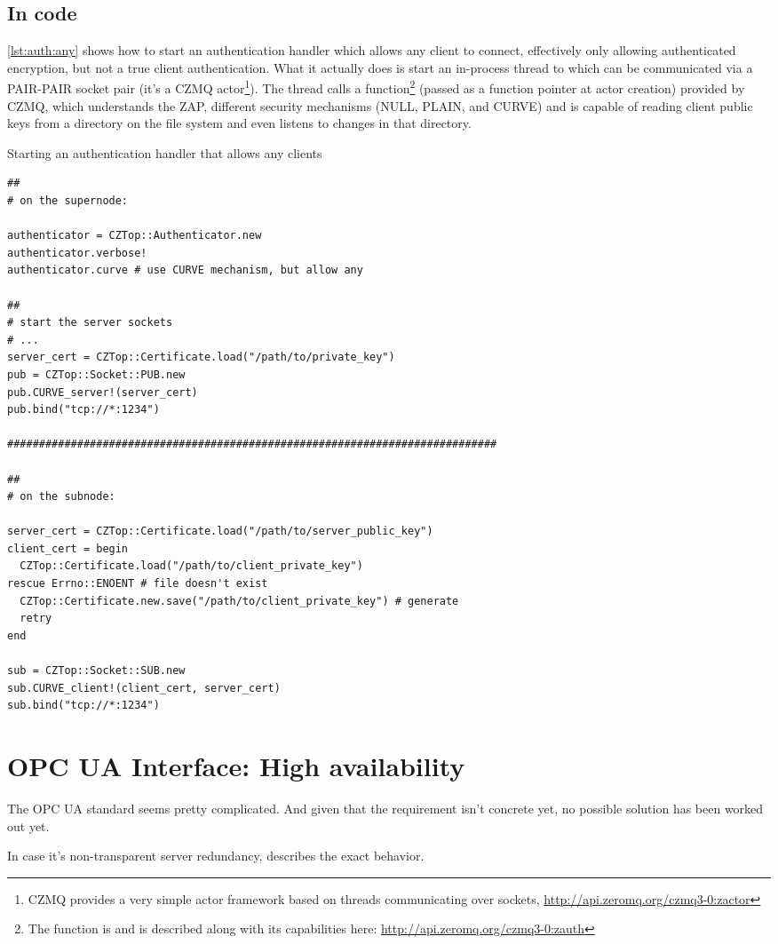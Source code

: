 \subsection{In code}
\autoref{lst:auth:any} shows how to start an authentication handler which
allows any client to connect, effectively only allowing authenticated
encryption, but not a true client authentication. What it actually does is
start an in-process thread to which can be communicated via a PAIR-PAIR socket
pair (it's a CZMQ actor\footnote{CZMQ provides a very simple actor framework
based on threads communicating over \zmq sockets,
\url{http://api.zeromq.org/czmq3-0:zactor}}). The thread calls a
function\footnote{The function is  and is described along
with its capabilities here: \url{http://api.zeromq.org/czmq3-0:zauth}} (passed
as a function pointer at actor creation) provided by CZMQ, which understands
the \gls{ZAP}, different security mechanisms (NULL, PLAIN, and CURVE) and is
capable of reading client public keys from a directory on the file system and
even listens to changes in that directory.

\begin{listing}
	\caption{Starting an authentication handler that allows any clients}
	\label{lst:auth:any}
	\begin{verbatim}
##
# on the supernode:

authenticator = CZTop::Authenticator.new
authenticator.verbose!
authenticator.curve # use CURVE mechanism, but allow any

##
# start the server sockets
# ...
server_cert = CZTop::Certificate.load("/path/to/private_key")
pub = CZTop::Socket::PUB.new
pub.CURVE_server!(server_cert)
pub.bind("tcp://*:1234")

#############################################################################

##
# on the subnode:

server_cert = CZTop::Certificate.load("/path/to/server_public_key")
client_cert = begin
  CZTop::Certificate.load("/path/to/client_private_key")
rescue Errno::ENOENT # file doesn't exist
  CZTop::Certificate.new.save("/path/to/client_private_key") # generate
  retry
end

sub = CZTop::Socket::SUB.new
sub.CURVE_client!(client_cert, server_cert)
sub.bind("tcp://*:1234")
	\end{verbatim}
\end{listing}

\section{OPC UA Interface: High availability}\label{sec:approach:opc-ua}
The OPC UA standard seems pretty complicated. And given that the requirement
isn't concrete yet, no possible solution has been worked out yet.

In case it's non-transparent server redundancy, \cite[6.4.2.4 Non-transparent
Redundancy, p.~96]{opc-ua:behavior:server-redundancy} describes the exact
behavior.

